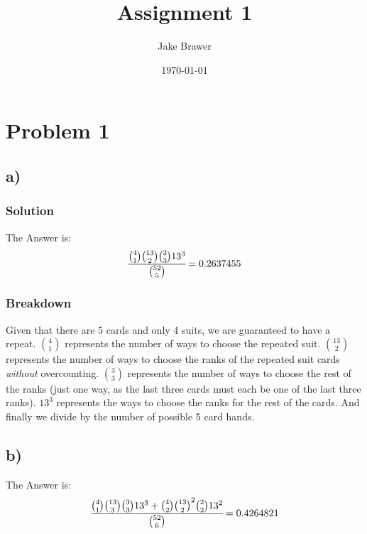 \documentclass[11pt]{article}
\author{Jake Brawer}
\date{\today}
\title{Assignment 1}
\begin{document}
\maketitle

\section*{Problem 1}
\label{sec:org29f5a92}
\subsection*{a)}
\label{sec:org672cbc1}

\subsubsection*{Solution}
\label{sec:orged64820}

The Answer is: 
\begin{equation}
\cfrac{{{4}\choose{1}} {{13}\choose{2}} {{3}\choose{3}} 13^3}{{{52}\choose{5}}} = 0.2637455
\end{equation}

\subsubsection*{Breakdown}
\label{sec:orgc4c2790}

Given that there are 5 cards and only 4 suits, we are guaranteed to have a repeat. \({{4}\choose{1}}\) represents the number of ways to choose the repeated suit. \({{13}\choose{2}}\) represents the number of ways to choose the ranks of the repeated suit cards \emph{without} overcounting. \({{3}\choose{3}}\) represents the number of ways to choose the rest of the ranks (just one way, as the last three cards must each be one of the last three ranks). \(13^{3}\) represents the ways to choose the ranks for the rest of the cards. And finally we divide by the number of possible 5 card hands. 

\subsection*{b)}
\label{sec:orgd4c6719}


The Answer is: 
\begin{equation}
\cfrac{{{4}\choose{1}} {{13}\choose{3}} {{3}\choose{3}} 13^3 + {{4}\choose{2}} {{13}\choose{2}}^{2} {{2}\choose{2}} 13^{2}} {{{52}\choose{6}}} = 0.4264821
\end{equation}
\end{document}
